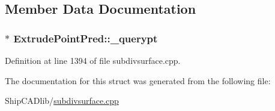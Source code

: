 \subsection{Member Data Documentation}
\hypertarget{structExtrudePointPred_af9fa40238ef74aca6b8f8d7e303aafb4}{
\subsubsection[{\-\_\-querypt}]{$\ast$ Extrude\-Point\-Pred\-::\-\_\-querypt}}\label{structExtrudePointPred_af9fa40238ef74aca6b8f8d7e303aafb4}


Definition at line 1394 of file subdivsurface.\-cpp.



The documentation for this struct was generated from the following file\-:\begin{DoxyCompactItemize}
\item 
Ship\-C\-A\-Dlib/\hyperlink{subdivsurface_8cpp}{subdivsurface.\-cpp}\end{DoxyCompactItemize}
